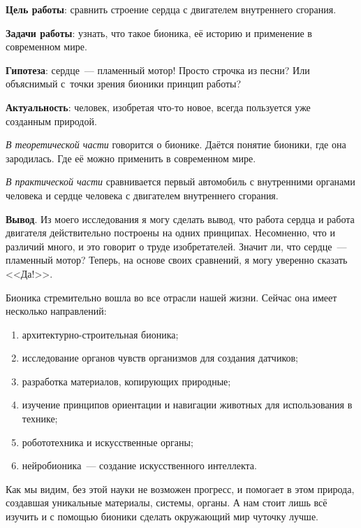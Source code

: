 \bigskip
{}



\makeProcTitleSchool



\textbf{Цель работы}: сравнить строение сердца с двигателем внутреннего сгорания.

\textbf{Задачи работы}: узнать, что такое бионика, её историю и применение в современном мире.

\textbf{Гипотеза}: сердце~--- пламенный мотор! Просто строчка из песни? Или объяснимый с~точки зрения бионики принцип работы?

\textbf{Актуальность}: человек, изобретая что-то новое, всегда пользуется уже созданным природой.

\textit{В теоретической части} говорится о бионике. Даётся понятие бионики, где она зародилась. Где её можно применить в современном  мире.

\textit{В практической части} сравнивается первый автомобиль с внутренними органами человека и сердце человека с двигателем внутреннего сгорания.

\textbf{Вывод}. Из моего исследования я могу сделать вывод, что работа сердца и работа двигателя действительно построены на одних принципах. Несомненно, что и различий много, и это говорит о труде изобретателей. Значит ли, что сердце~--- пламенный мотор? Теперь, на основе своих сравнений, я могу уверенно сказать <<Да!>>.

Бионика стремительно вошла во все отрасли нашей жизни. Сейчас она имеет несколько направлений:
\begin{enumerate}[noitemsep]\vspace{-8pt}
\item архитектурно-строительная бионика;
\item исследование органов чувств организмов для создания датчиков;
\item разработка материалов, копирующих природные;
\item изучение принципов ориентации и навигации животных для использования в технике;
\item робототехника и искусственные органы;
\item нейробионика~--- создание искусственного интеллекта.
\end{enumerate}\vspace{-8pt}

Как мы видим, без этой науки не возможен прогресс, и помогает в этом природа, создавшая уникальные материалы, системы, органы. А нам стоит лишь всё изучить и с помощью бионики сделать окружающий мир чуточку лучше.
